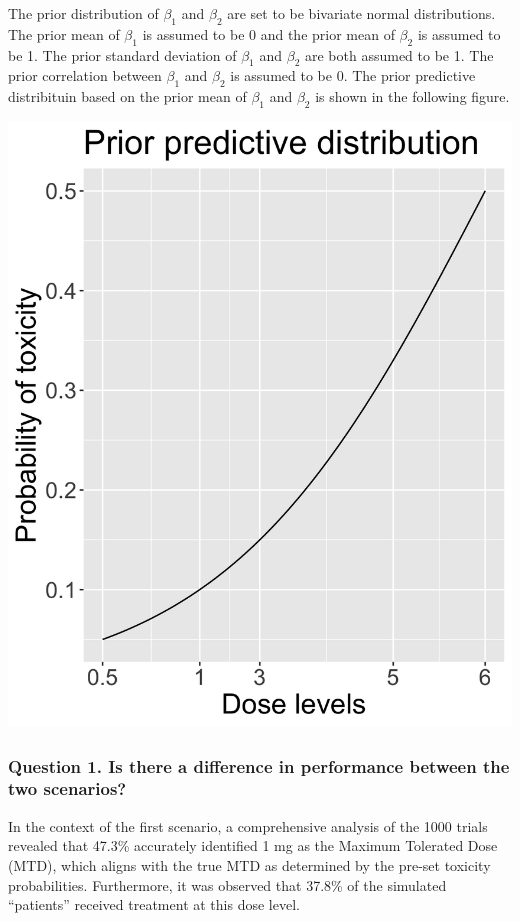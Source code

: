 \documentclass[
]{article}
\begin{document}
The prior distribution of \(\beta_1\) and \(\beta_2\) are set to be
bivariate normal distributions. The prior mean of \(\beta_1\) is assumed
to be 0 and the prior mean of \(\beta_2\) is assumed to be 1. The prior
standard deviation of \(\beta_1\) and \(\beta_2\) are both assumed to be
1. The prior correlation between \(\beta_1\) and \(\beta_2\) is assumed
to be 0. The prior predictive distribituin based on the prior mean of
\(\beta_1\) and \(\beta_2\) is shown in the following figure.

\includegraphics{wenqian_sim_results/prior.png}

\hypertarget{question-1.-is-there-a-difference-in-performance-between-the-two-scenarios}{%
\subsubsection{Question 1. Is there a difference in performance between
the two
scenarios?}\label{question-1.-is-there-a-difference-in-performance-between-the-two-scenarios}}

In the context of the first scenario, a comprehensive analysis of the
1000 trials revealed that 47.3\% accurately identified 1 mg as the
Maximum Tolerated Dose (MTD), which aligns with the true MTD as
determined by the pre-set toxicity probabilities. Furthermore, it was
observed that 37.8\% of the simulated ``patients'' received treatment at
this dose level.
\end{document}
